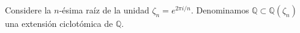 Considere la $n$-ésima raíz de la unidad $\zeta_{n}=e^{2\pi i/n}$. Denominamos $\mathbb{Q}\subset \mathbb{Q}(\zeta_{n})$ una extensión ciclotómica de $\mathbb{Q}$.
